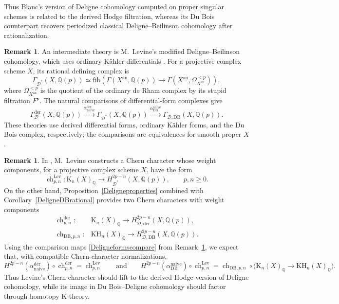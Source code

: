 \documentclass{amsart}
\theoremstyle{plain}
\theoremstyle{definition}
\newtheorem{remark}[prop]{Remark}
\newcommand{\bbQ}{\mathbb{Q}}
\newcommand{\fib}{\mathrm{fib}}
\newcommand{\K}{\mathrm{K}}
\newcommand{\KH}{\mathrm{KH}}
\DeclareMathOperator{\ch}{ch}
\newcommand{\DB}{\mathrm{DB}}
\newcommand{\der}{\mathrm{der}}
\newcommand{\an}{\mathrm{an}}
\begin{document}
Thus Blanc's version of Deligne cohomology computed on proper singular schemes is related to the derived Hodge filtration, whereas its Du Bois counterpart recovers periodized classical Deligne--Beilinson cohomology after rationalization.

\begin{remark}\label{LevineDeligne}
An intermediate theory is M.~Levine's modified Deligne--Beilinson cohomology, which uses ordinary K\"ahler differentials \cite{Lev92}.
For a projective complex scheme $X$, its rational defining complex is
\[
\Gamma_{\mathcal D^*}(X,\bbQ(p))
\simeq
\fib(\Gamma(X^{\an},\bbQ(p))
\longrightarrow
\Gamma(X^{\an},\Omega_{X^{\an}}^{<p})),
\]
where $\Omega_{X^{\an}}^{<p}$ is the quotient of the ordinary de Rham complex by its stupid filtration $F^p$.
The natural comparisons of differential-form complexes give
\begin{equation}\label{Deligneformscompare}
\Gamma_{\mathcal D}^{\der}(X,\bbQ(p))
\xrightarrow{\alpha^{\der}_{\mathrm{naive}}}
\Gamma_{\mathcal D^*}(X,\bbQ(p))
\xrightarrow{\alpha^{\mathrm{naive}}_{\DB}}
\Gamma_{\mathcal D,\DB}(X,\bbQ(p)).
\end{equation}
These theories use derived differential forms, ordinary K\"ahler forms, and the Du Bois complex, respectively;
the comparisons are equivalences for smooth proper $X$.
\end{remark}

\begin{remark}
In \cite[\S2, p.~125]{Lev92}, M.~Levine constructs a Chern character whose weight components, for a projective complex scheme $X$, have the form
\[
\ch^{\mathrm{Lev}}_{p,n}:
\K_n(X)_{\bbQ}
\longrightarrow
H_{\mathcal D^*}^{2p-n}(X,\bbQ(p)),
\qquad p,n\geq0.
\]
On the other hand, Proposition~\ref{Deligneproperties} combined with Corollary~\ref{DeligneDBrational} provides two Chern characters with weight components
\[
\begin{aligned}
\ch^{\der}_{p,n}:&
\K_n(X)_{\bbQ}
\longrightarrow
H_{\mathcal D,\der}^{2p-n}(X,\bbQ(p)),\\
\ch_{\DB,p,n}:&
\KH_n(X)_{\bbQ}
\longrightarrow
H_{\mathcal D,\DB}^{2p-n}(X,\bbQ(p)).
\end{aligned}
\]
Using the comparison maps \eqref{Deligneformscompare}
from Remark~\ref{LevineDeligne}, we expect that, with compatible Chern-character normalizations,
\[
H^{2p-n}(\alpha^{\der}_{\mathrm{naive}})
\circ\ch^{\der}_{p,n}
=
\ch^{\mathrm{Lev}}_{p,n}
\qquad\text{and}\qquad
H^{2p-n}(\alpha^{\mathrm{naive}}_{\DB})
\circ\ch^{\mathrm{Lev}}_{p,n}
=
\ch_{\DB,p,n}
\circ\bigl(\K_n(X)_{\bbQ}\longrightarrow \KH_n(X)_{\bbQ}\bigr).
\]
Thus Levine's Chern character should lift to the derived Hodge version of Deligne cohomology, while its image in Du Bois--Deligne cohomology should factor through homotopy $\K$-theory.
\end{remark}
\end{document}
